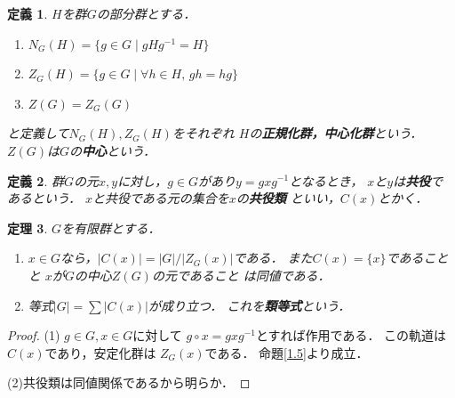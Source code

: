 \documentclass[dvipdfmx,a4paper,12pt]{jsarticle}
\newcommand{\uref}[1]{\hyperref[#1]{\textcolor{TiffanyBlue}{\underline{\ref*{#1}}}}}
\newtheorem{theorem}{定理}[section]
\newtheorem{definition}[theorem]{定義}
\begin{document}
\begin{definition}
    $H$を群$G$の部分群とする．
    \begin{enumerate}
        \item $N_G(H)=\{g\in G\mid gHg^{-1}=H\}$
        \item $Z_G(H)=\{g\in G\mid \forall h \in H
        ,\, gh=hg\}$
        \item $Z(G)=Z_G(G)$
    \end{enumerate}
    と定義して$N_G(H),Z_G(H)$をそれぞれ
    $H$の\textbf{正規化群，中心化群}という．
    $Z(G)$は$G$の\textbf{中心}という．
\end{definition}

\begin{definition}
    群$G$の元$x,y$に対し，$g\in G$があり$y=gxg^{-1}$となるとき，
    $x$と$y$は\textbf{共役}であるという．
    $x$と共役である元の集合を$x$の\textbf{共役類}
    といい，$C(x)$とかく．
\end{definition}



\begin{theorem}\label{ruitousiki}
    $G$を有限群とする．
    \begin{enumerate}
        \item $x\in G$なら，$|C(x)|=
        |G|/|Z_G(x)|$である．
        また$C(x)=\{x\}$であることと
        $x$が$G$の中心$Z(G)$の元であること
        は同値である．
        \item 等式$|G|=\sum |C(x)|$が成り立つ．
        これを\textbf{類等式}という．
    \end{enumerate}
\end{theorem}



\begin{proof}
    (1)
    $g\in G,x\in G$に対して
    $g\circ x=gxg^{-1}$とすれば作用である．
    この軌道は$C(x)$であり，安定化群は
    $Z_G(x)$である．
    命題\uref{1.5}より成立．

    (2)共役類は同値関係であるから明らか．
\end{proof}
\end{document}

